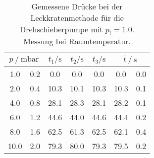 \begin{table} 
\centering 
\caption{Gemessene Drücke bei der Leckkratenmethode für die Drehschieberpumpe mit $p_{\mathrm{l}}=1.0$. Messung bei Raumtemperatur.} 
\label{tab: leck_dreh_leck_1.0.pdf} 
\begin{tabular}{S[table-format=1.1]@{${}\pm{}$} S[table-format=1.1] S S S S[table-format=1.1]@{${}\pm{}$} S[table-format=1.1] } 
\toprule  
{} & {$t_1 / \si{ \second}$} & {$t_2 / \si{ \second}$} & {$t_3 / \si{ \second}$} &  \\ 
 & 0.2 & 0.0 & 0.0 & 0.0 & 0.0 & 0.0\\ 
2.0 & 0.4 & 10.3 & 10.1 & 10.3 & 10.3 & 0.1\\ 
4.0 & 0.8 & 28.1 & 28.3 & 28.1 & 28.2 & 0.1\\ 
6.0 & 1.2 & 44.6 & 44.0 & 44.6 & 44.4 & 0.2\\ 
8.0 & 1.6 & 62.5 & 61.3 & 62.5 & 62.1 & 0.4\\ 
10.0 & 2.0 & 79.3 & 80.0 & 79.3 & 79.5 & 0.2\\ 
\bottomrule 
\end{tabular} 
\end{table}